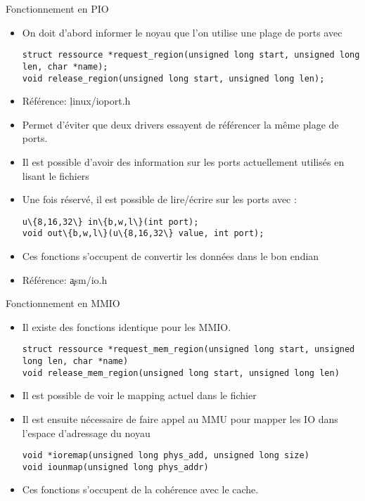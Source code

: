 \begin{frame}[fragile=singleslide]{Fonctionnement en PIO}
  \begin{itemize} 
  \item On doit  d'abord informer le noyau que  l'on utilise une plage
    de ports avec
    \begin{lstlisting} 
struct ressource *request_region(unsigned long start, unsigned long len, char *name);
void release_region(unsigned long start, unsigned long len);
    \end{lstlisting} 
  \item Référence: \c{linux/ioport.h}
  \item  Permet d'éviter que  deux drivers  essayent de  référencer la
    même plage de ports.
  \item  Il  est  possible  d'avoir  des  information  sur  les  ports
    actuellement utilisés en lisant le fichiers 
  \item Une fois réservé, il est possible de lire/écrire sur les ports
    avec :
    \begin{lstlisting} 
u\{8,16,32\} in\{b,w,l\}(int port);
void out\{b,w,l\}(u\{8,16,32\} value, int port);
    \end{lstlisting} 
  \item Ces fonctions s'occupent de  convertir les données dans le bon
    endian
  \item Référence: \c{asm/io.h}
  \end{itemize} 
\end{frame} 

\begin{frame}[fragile=singleslide]{Fonctionnement en MMIO}
  \begin{itemize} 
  \item Il existe des fonctions identique pour les MMIO.
    \begin{lstlisting} 
struct ressource *request_mem_region(unsigned long start, unsigned long len, char *name)
void release_mem_region(unsigned long start, unsigned long len)
    \end{lstlisting} 
  \item  Il est possible  de voir  le mapping  actuel dans  le fichier
  \item Il  est ensuite nécessaire de  faire appel au  MMU pour mapper
    les IO dans l'espace d'adressage du noyau
    \begin{lstlisting} 
void *ioremap(unsigned long phys_add, unsigned long size)
void iounmap(unsigned long phys_addr)
    \end{lstlisting}  
  \item Ces fonctions s'occupent de la cohérence avec le cache.
\end{itemize} 
\end{frame}

